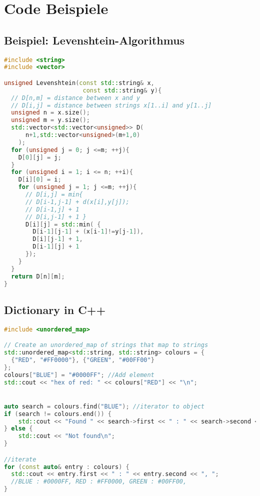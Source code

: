 \section{Code Beispiele}

\subsection{Beispiel: Levenshtein-Algorithmus}
\begin{lstlisting}[language=C++]
#include <string>
#include <vector>

unsigned Levenshtein(const std::string& x, 
                      const std::string& y){
  // D[n,m] = distance between x and y
  // D[i,j] = distance between strings x[1..i] and y[1..j]
  unsigned n = x.size();
  unsigned m = y.size();
  std::vector<std::vector<unsigned>> D(
      n+1,std::vector<unsigned>(m+1,0)
    );
  for (unsigned j = 0; j <=m; ++j){
    D[0][j] = j;
  }
  for (unsigned i = 1; i <= n; ++i){
    D[i][0] = i;
    for (unsigned j = 1; j <=m; ++j){
      // D[i,j] = min{ 
      // D[i-1,j-1] + d(x[i],y[j]);
      // D[i-1,j] + 1
      // D[i,j-1] + 1 }
      D[i][j] = std::min( {
        D[i-1][j-1] + (x[i-1]!=y[j-1]), 
        D[i][j-1] + 1, 
        D[i-1][j] + 1
      });
    }
  }
  return D[n][m];
}
\end{lstlisting}

\subsection{Dictionary in C++}
\begin{lstlisting}[language=C++]
#include <unordered_map>

// Create an unordered_map of strings that map to strings
std::unordered_map<std::string, std::string> colours = {
  {"RED", "#FF0000"}, {"GREEN", "#00FF00"}
};
colours["BLUE"] = "#0000FF"; //Add element
std::cout << "hex of red: " << colours["RED"] << "\n";


auto search = colours.find("BLUE"); //iterator to object
if (search != colours.end()) {
    std::cout << "Found " << search->first << " : " << search->second << '\n';
} else {
    std::cout << "Not found\n";
}

//iterate
for (const auto& entry : colours) {
  std::cout << entry.first << " : " << entry.second << ", ";
  //BLUE : #0000FF, RED : #FF0000, GREEN : #00FF00,
}
\end{lstlisting}